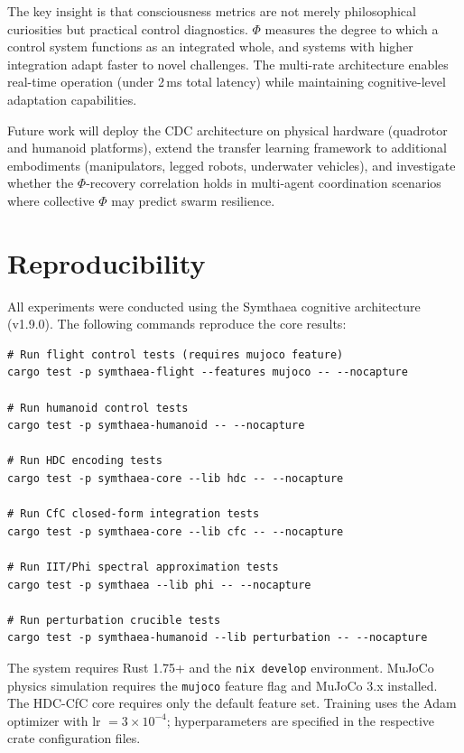 \documentclass[11pt,a4paper]{article}
\begin{document}
The key insight is that consciousness metrics are not merely philosophical curiosities but practical control diagnostics.
$\Phi$ measures the degree to which a control system functions as an integrated whole, and systems with higher integration adapt faster to novel challenges.
The multi-rate architecture enables real-time operation (under 2\,ms total latency) while maintaining cognitive-level adaptation capabilities.

Future work will deploy the CDC architecture on physical hardware (quadrotor and humanoid platforms), extend the transfer learning framework to additional embodiments (manipulators, legged robots, underwater vehicles), and investigate whether the $\Phi$-recovery correlation holds in multi-agent coordination scenarios where collective $\Phi$ may predict swarm resilience.

\section{Reproducibility}
\label{sec:reproducibility}

All experiments were conducted using the Symthaea cognitive architecture (v1.9.0). The following commands reproduce the core results:

\begin{verbatim}
# Run flight control tests (requires mujoco feature)
cargo test -p symthaea-flight --features mujoco -- --nocapture

# Run humanoid control tests
cargo test -p symthaea-humanoid -- --nocapture

# Run HDC encoding tests
cargo test -p symthaea-core --lib hdc -- --nocapture

# Run CfC closed-form integration tests
cargo test -p symthaea-core --lib cfc -- --nocapture

# Run IIT/Phi spectral approximation tests
cargo test -p symthaea --lib phi -- --nocapture

# Run perturbation crucible tests
cargo test -p symthaea-humanoid --lib perturbation -- --nocapture
\end{verbatim}

The system requires Rust 1.75+ and the \texttt{nix develop} environment. MuJoCo physics simulation requires the \texttt{mujoco} feature flag and MuJoCo 3.x installed. The HDC-CfC core requires only the default feature set. Training uses the Adam optimizer with lr $= 3 \times 10^{-4}$; hyperparameters are specified in the respective crate configuration files.
\end{document}
